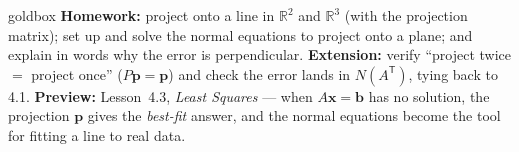 \documentclass[10pt]{article}
\newcommand{\xx}{\mathbf{x}}
\newcommand{\bb}{\mathbf{b}}
\newcommand{\pp}{\mathbf{p}}
\newcommand{\T}{\mathsf{T}}
\begin{document}
\begin{skillbox}{goldbox}
\textbf{Homework:} project onto a line in $\mathbb{R}^2$ and $\mathbb{R}^3$ (with the projection matrix);
set up and solve the normal equations to project onto a plane; and explain in words why the error is
perpendicular. \textbf{Extension:} verify ``project twice $=$ project once'' ($P\pp=\pp$) and check the
error lands in $N(A^{\T})$, tying back to 4.1. \textbf{Preview:} Lesson~4.3, \emph{Least Squares} ---
when $A\xx=\bb$ has no solution, the projection $\pp$ gives the \emph{best-fit} answer, and the normal
equations become the tool for fitting a line to real data.
\end{skillbox}
\end{document}
